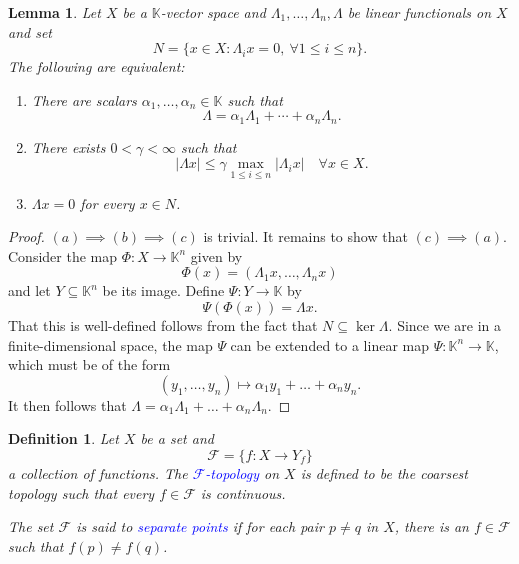\documentclass[12pt]{article}
\theoremstyle{thmstyle}
\newtheorem{lemma}[theorem]{Lemma}
\theoremstyle{defstyle}
\newtheorem{definition}[theorem]{Definition}
\newcommand{\R}{\mathbb{R}}
\newcommand{\bbC}{\mathbb{C}}
\newcommand{\K}{\mathbb{K}} %
\newcommand{\scrF}{\mathscr F}
\newcommand{\define}[1]{\textcolor{blue}{\textit{#1}}}
\renewcommand{\le}{\leqslant}
\begin{document}
\begin{lemma}
    Let $X$ be a $\K$-vector space and $\Lambda_1,\dots,\Lambda_n,\Lambda$ be linear functionals on $X$ and set 
    \begin{equation*}
        N = \{x\in X\colon \Lambda_i x = 0,~\forall 1\le i\le n\}.
    \end{equation*}
    The following are equivalent: 
    \begin{enumerate}[label=(\alph*)]
        \item There are scalars $\alpha_1,\dots,\alpha_n\in\K$ such that 
        \begin{equation*}
            \Lambda = \alpha_1\Lambda_1 + \cdots + \alpha_n\Lambda_n.
        \end{equation*}
        \item There exists $0 < \gamma < \infty$ such that 
        \begin{equation*}
            |\Lambda x|\le\gamma\max_{1\le i\le n}|\Lambda_i x|\quad\forall x\in X.
        \end{equation*}
        \item $\Lambda x = 0$ for every $x\in N$.
    \end{enumerate}
\end{lemma}
\begin{proof}
    $(a)\implies(b)\implies(c)$ is trivial. It remains to show that $(c)\implies(a)$. Consider the map $\Phi: X\to\K^n$ given by 
    \begin{equation*}
        \Phi(x) = \left(\Lambda_1 x,\dots,\Lambda_n x\right)
    \end{equation*}
    and let $Y\subseteq\K^n$ be its image. Define $\Psi: Y\to\K$ by 
    \begin{equation*}
        \Psi(\Phi(x)) = \Lambda x.
    \end{equation*}
    That this is well-defined follows from the fact that $N\subseteq\ker\Lambda$. Since we are in a finite-dimensional space, the map $\Psi$ can be extended to a linear map $\Psi:\K^n\to\K$, which must be of the form 
    \begin{equation*}
        (y_1,\dots, y_n)\mapsto\alpha_1y_1 + \dots + \alpha_n y_n.
    \end{equation*}
    It then follows that $\Lambda = \alpha_1\Lambda_1 + \dots + \alpha_n\Lambda_n$.
\end{proof}

\begin{definition}
    Let $X$ be a set and 
    \begin{equation*}
        \scrF = \{f: X\to Y_f\}
    \end{equation*}
    a collection of functions. The \define{$\scrF$-topology} on $X$ is defined to be the coarsest topology such that every $f\in\scrF$ is continuous.

    The set $\scrF$ is said to \define{separate points} if for each pair $p\ne q$ in $X$, there is an $f\in\scrF$ such that $f(p)\ne f(q)$.
\end{definition}
\end{document}
